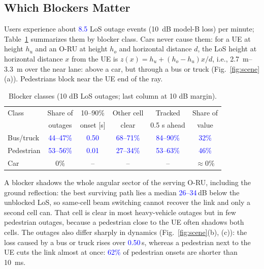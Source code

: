 \documentclass[conference]{IEEEtran}
\newcommand{\prelim}[1]{\textcolor{blue}{#1}}
\providecommand{\numEventsPerMin}{\prelim{8.5}}
\providecommand{\numBusShare}{\prelim{44--47\%}}
\providecommand{\numPedShare}{\prelim{53--56\%}}
\providecommand{\numSameCellLoss}{\prelim{26--34}}
\providecommand{\numOtherCellBus}{\prelim{68--71\%}}
\providecommand{\numOtherCellPed}{\prelim{27--34\%}}
\providecommand{\numOnsetBus}{\prelim{0.50}}
\providecommand{\numOnsetPed}{\prelim{0.01}}
\providecommand{\numLeadBus}{\prelim{84--90\%}}
\providecommand{\numLeadPed}{\prelim{53--63\%}}
\providecommand{\numOnsetPedFast}{\prelim{62\%}}
\providecommand{\numValuePedTen}{\prelim{46\%}}
\providecommand{\numValueBusTen}{\prelim{32\%}}
\begin{document}
\subsection{Which Blockers Matter}
Users experience about \numEventsPerMin{} LoS outage events
(\SI{10}{dB} model-B loss) per minute; Table~\ref{tab:classes}
summarizes them by blocker class. Cars never cause them: for a UE at
height $h_u$ and an O-RU at height $h_o$ and horizontal distance $d$, the
LoS height at horizontal distance $x$ from the UE is
$z(x)=h_u+(h_o-h_u)x/d$, i.e., \SI{2.7}{m}--\SI{3.3}{m} over the near
lane: above a car, but through a bus or truck (Fig.~\ref{fig:scene}(a)).
Pedestrians block near the UE end of the ray.

\begin{table}[t]
\centering
\caption{Blocker classes (10 dB LoS outages; last column at 10 dB margin).}
\label{tab:classes}
\setlength{\tabcolsep}{2.2pt}
\begin{tabular}{@{}lccccc@{}}
\toprule
Class & Share of & 10--90\% & Other cell & Tracked & Share of \\
      & outages  & onset [s] & clear & 0.5 s ahead & value \\
\midrule
Bus/truck  & \numBusShare & \numOnsetBus & \numOtherCellBus & \numLeadBus & \numValueBusTen\\
Pedestrian & \numPedShare & \numOnsetPed & \numOtherCellPed & \numLeadPed & \numValuePedTen\\
Car        & 0\%          & --           & --               & --          & $\approx$0\%\\
\bottomrule
\end{tabular}
\end{table}

A blocker shadows the whole angular sector of the serving O-RU,
including the ground reflection: the best surviving path lies a median
\numSameCellLoss\,dB below the unblocked LoS, so same-cell beam
switching cannot recover the link and only a second cell can. That cell
is clear in most heavy-vehicle outages but in few pedestrian outages,
because a pedestrian close to the UE often shadows both cells. The
outages also differ sharply in dynamics (Fig.~\ref{fig:scene}(b), (c)):
the loss caused by a bus or truck rises over \numOnsetBus\,s, whereas a
pedestrian next to the UE cuts the link almost at once:
\numOnsetPedFast{} of pedestrian onsets are shorter than \SI{10}{ms}.
\end{document}
